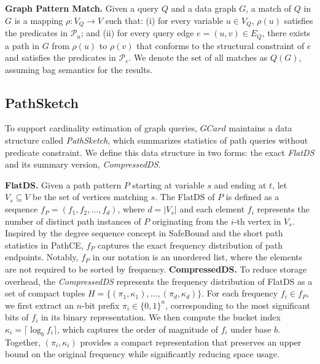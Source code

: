 \noindent\textbf{Graph Pattern Match.} Given a query $Q$ and a data graph $G$, a match of $Q$ in $G$ is a mapping $\rho: V_Q \rightarrow V$ such that: (i) for every variable $u \in V_Q$, $\rho(u)$ satisfies the predicates in $\mathcal{P}_u$; and (ii) for every query edge $e = (u, v) \in E_Q$, there exists a path in $G$ from $\rho(u)$ to $\rho(v)$ that conforms to the structural constraint of $e$ and satisfies the predicates in $\mathcal{P}_e$. We denote the set of all matches as $Q(G)$, assuming bag semantics for the results.


\subsection{PathSketch}

\noindent To support cardinality estimation of graph queries, $GCard$ maintains a data structure called \textit{PathSketch}, which summarizes statistics of path queries without predicate constraint. We define this data structure in two forms: the exact \textit{FlatDS} and its summary version, \textit{CompressedDS}.

\noindent\textbf{FlatDS.} Given a path pattern $P$ starting at variable $s$ and ending at $t$, let $V_s \subseteq V$ be the set of vertices matching $s$. The FlatDS of $P$ is defined as a sequence $f_P = (f_1, f_2, \dots, f_d)$, where $d = |V_s|$ and each element $f_i$ represents the number of distinct path instances of $P$ originating from the $i$-th vertex in $V_s$. Inspired by the degree sequence concept in SafeBound \cite{deedsSafeBoundPracticalSystem2023} and the short path statistics in PathCE\cite{full}, $f_P$ captures the exact frequency distribution of path endpoints. Notably, $f_P$ in our notation is an unordered list, where the elements are not required to be sorted by frequency.
\noindent\textbf{CompressedDS.}
To reduce storage overhead, the \textit{CompressedDS} represents
the frequency distribution of FlatDS as a set of compact tuples
$H = \{(\pi_1, \kappa_1), \dots, (\pi_d, \kappa_d)\}$.
For each frequency $f_i \in f_P$, we first extract an $n$-bit prefix
$\pi_i \in \{0,1\}^n$, corresponding to the most significant bits of
$f_i$ in its binary representation.
We then compute the bucket index
$\kappa_i = \lceil \log_b f_i \rceil$, which captures the order of
magnitude of $f_i$ under base $b$.
Together, $(\pi_i, \kappa_i)$ provides a compact representation
that preserves an upper bound on the original frequency while
significantly reducing space usage.

